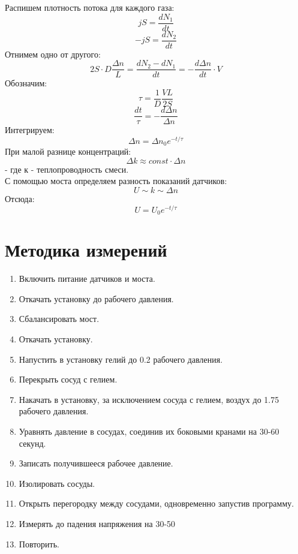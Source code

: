 \documentclass[1 pt]{article}
\begin{document}
Распишем плотность потока для каждого газа:
\begin{equation*}
    jS = \frac{dN_1}{dt}
\end{equation*}
\begin{equation*}
    -jS = \frac{dN_2}{dt}
\end{equation*}
Отнимем одно от другого:
\begin{equation*}
    2S \cdot D \frac{\Delta n}{L} = \frac{dN_2-dN_1}{dt} = - \frac{d\Delta n}{dt} \cdot V
\end{equation*}
Обозначим:
\begin{equation}
    \tau = \frac{1}{D} \frac{VL}{2S}
\end{equation}
\begin{equation*}
    \frac{dt}{\tau} = - \frac{d \Delta n}{\Delta n}
\end{equation*}
Интегрируем:
\begin{equation}
    \Delta n = \Delta n_0 e^{-t/{\tau}}
\end{equation}
При малой разнице концентраций:
\begin{equation*}
    \Delta k \approx const \cdot \Delta n
\end{equation*}
- где к - теплопроводность смеси. \\
С помощью моста определяем разность показаний датчиков:
\begin{equation*}
    U \sim k \sim \Delta n
\end{equation*}
Отсюда:
\begin{equation}
    U = U_{0} e^{-t/\tau}
\end{equation}
\newpage
\section{Методика измерений}
\begin{enumerate}
    \item Включить питание датчиков и моста.
    \item Откачать установку до рабочего давления.
    \item Сбалансировать мост.
    \item Откачать установку.
    \item Напустить в установку гелий до 0.2 рабочего давления.
    \item Перекрыть сосуд с гелием.
    \item Накачать в установку, за исключением сосуда с гелием, воздух до 1.75 рабочего давления.
    \item Уравнять давление в сосудах, соединив их боковыми кранами на 30-60 секунд.
    \item Записать получившееся рабочее давление.
    \item Изолировать сосуды.
    \item Открыть перегородку между сосудами, одновременно запустив программу.
    \item Измерять до падения напряжения на 30-50 %
    \item Повторить.
\end{enumerate}
\newpage
\end{document}
